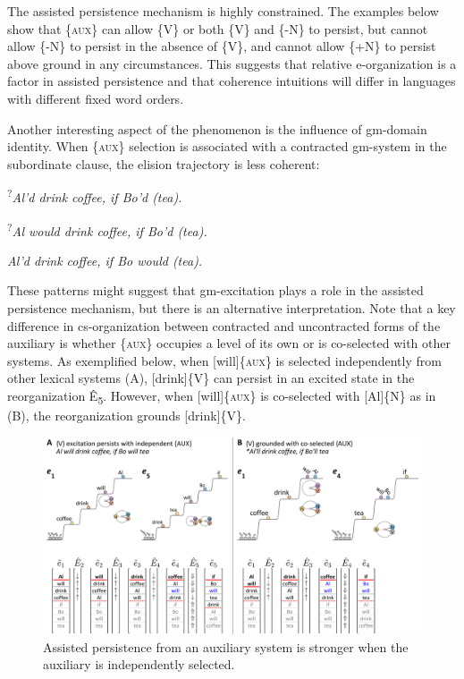   The assisted persistence mechanism is highly constrained. The examples below show that \{\textsc{aux}\} can allow \{V\} or both \{V\} and \{-N\} to persist, but cannot allow \{-N\} to persist in the absence of \{V\}, and cannot allow \{+N\} to persist above ground in any circumstances. This suggests that relative e-organization is a factor in assisted persistence and that coherence intuitions will differ in languages with different fixed word orders. 

  Another interesting aspect of the phenomenon is the influence of gm-domain identity. When \{\textsc{aux}\} selection is associated with a contracted gm-system in the subordinate clause, the elision trajectory is less coherent: 

      \textsuperscript{?}\textit{Al’d drink coffee, if Bo’d (tea).}
\z

    \textsuperscript{?}\textit{Al would drink coffee, if Bo’d (tea).}
\z

    \textit{Al’d drink coffee, if Bo would (tea).}
\z

  These patterns might suggest that gm-excitation plays a role in the assisted persistence mechanism, but there is an alternative interpretation. Note that a key difference in cs-organization between contracted and uncontracted forms of the auxiliary is whether \{\textsc{aux}\} occupies a level of its own or is co-selected with other systems. As exemplified below, when [will]\{\textsc{aux}\} is selected independently from other lexical systems (A), [drink]\{V\} can persist in an excited state in the reorganization Ê\textsubscript{5}. However, when [will]\{\textsc{aux}\} is co-selected with [Al]\{N\} as in (B), the reorganization grounds [drink]\{V\}.

  
\begin{figure}
\includegraphics[width=\textwidth]{figures/Tilsen-img148.png}
\caption{Assisted persistence from an auxiliary system is stronger when the auxiliary is independently selected.}
\label{fig:7:4}
\end{figure}
 

